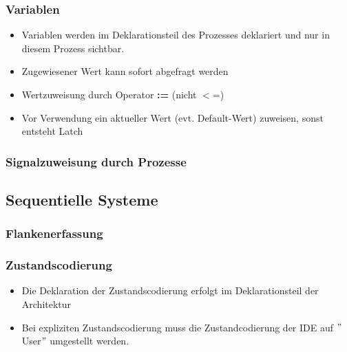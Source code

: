 		\subsubsection{Variablen}
			\begin{multicols}{2}
				\begin{itemize}
					\item Variablen werden im Deklarationsteil des Prozesses deklariert 
						und nur in diesem Prozess sichtbar.
					\item Zugewiesener Wert kann sofort abgefragt werden
					\item Wertzuweisung durch Operator \textbf{:=} (nicht $<$=)
					\item Vor Verwendung ein aktueller Wert (evt. Default-Wert) zuweisen, 
						sonst entsteht Latch
				\end{itemize}
				
			\end{multicols}

		\subsubsection{Signalzuweisung durch Prozesse}
			\begin{multicols}{2}
				
			\end{multicols}

	\subsection{Sequentielle Systeme}
		\subsubsection{Flankenerfassung}
			\begin{multicols}{2}
				
			\end{multicols}
		\subsubsection{Zustandscodierung}
			\begin{multicols}{2}
				\begin{itemize}
					\item Die Deklaration der Zustandscodierung erfolgt im Deklarationsteil der Architektur
					\item Bei expliziten Zustandscodierung muss die Zustandcodierung der 
						IDE auf $"$User$"$ umgestellt werden.
				\end{itemize}
				
			\end{multicols}
